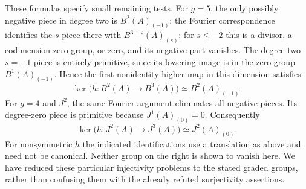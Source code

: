 These formulas specify small remaining tests. For $g=5$, the only
possibly negative piece in degree two is $B^2(A)_{(-1)}$:
the Fourier correspondence identifies the $s$-piece there with
$B^{3+s}(A)_{(s)}$; for $s\le-2$ this is a divisor,
a codimension-zero group, or zero, and its negative part vanishes.
The degree-two $s=-1$ piece is entirely primitive, since its
lowering image is in the zero group $B^1(A)_{(-1)}$.
Hence the first nonidentity higher map in this dimension satisfies
\[
 \ker\bigl(h:B^2(A)\to B^3(A)\bigr)
                 \simeq B^2(A)_{(-1)}.
\]
For $g=4$ and $J^2$, the same Fourier argument eliminates
all negative pieces. Its degree-zero piece is primitive because
$J^1(A)_{(0)}=0$. Consequently
\[
 \ker\bigl(h:J^2(A)\to J^3(A)\bigr)
                 \simeq J^2(A)_{(0)}.
\]
For nonsymmetric $h$ the indicated identifications use a translation
as above and need not be canonical. Neither group on the right
is shown to vanish here. We have reduced these particular
injectivity problems to the stated graded groups, rather than
confusing them with the already refuted surjectivity assertions.
